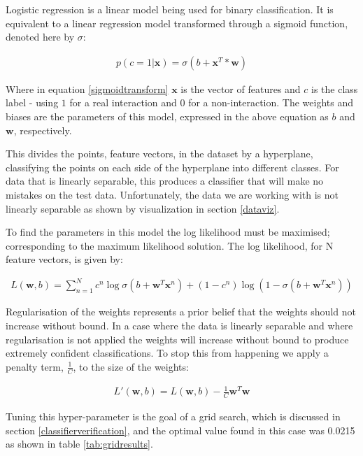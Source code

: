 Logistic regression is a linear model being used for binary classification.
It is equivalent to a linear regression model transformed through a sigmoid function\autocite[376]{murphy_machine_2012}, denoted here by $\sigma$:

\begin{align}
    p(c=1|\pmb{x}) = \sigma(b + \pmb{x}^{T}*\pmb{w})
    \label{sigmoidtransform}
\end{align}

Where in equation \ref{sigmoidtransform} $\pmb{x}$ is the vector of features and $c$ is the class label - using $1$ for a real interaction and $0$ for a non-interaction.
The weights and biases are the parameters of this model, expressed in the above equation as $b$ and $\pmb{w}$, respectively.

This divides the points, feature vectors, in the dataset by a hyperplane, classifying the points on each side of the hyperplane into different classes.
For data that is linearly separable, this produces a classifier that will make no mistakes on the test data.
Unfortunately, the data we are working with is not linearly separable as shown by visualization in section \ref{dataviz}.

To find the parameters in this model the log likelihood must be maximised; corresponding to the maximum likelihood solution.
The log likelihood, for N feature vectors, is given by:

\begin{align}
    L(\pmb{w},b) = \sum_{n=1}^{N} c^{n} \log \sigma(b + \pmb{w}^{T}\pmb{x}^{n}) + (1 - c^{n})\log (1 - \sigma(b + \pmb{w}^{T}\pmb{x}^{n}))
\end{align}

Regularisation of the weights represents a prior belief that the weights should not increase without bound.
In a case where the data is linearly separable and where regularisation is not applied the weights will increase without bound to produce extremely confident classifications\autocite[381]{barber_bayesian_2013}.
To stop this from happening we apply a penalty term, $\frac{1}{C}$, to the size of the weights:

\begin{align}
    L'(\pmb{w},b) = L(\pmb{w},b) - \frac{1}{C} \pmb{w}^{T}\pmb{w}
\end{align}

Tuning this hyper-parameter is the goal of a grid search, which is discussed in section \ref{classifierverification}, and the optimal value found in this case was 0.0215 as shown in table \ref{tab:gridresults}.

